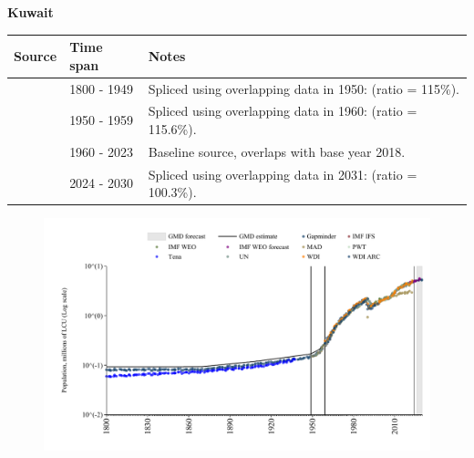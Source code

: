 \documentclass[12pt,a4paper,landscape]{article}
\begin{document}
\begin{adjustbox}{max totalsize={\paperwidth}{\paperheight},center}
\begin{minipage}[t][\textheight][t]{\textwidth}
\vspace*{0.5cm}
{}
\begin{center}
{\Large\bfseries Kuwait}
\end{center}
\vspace{0.5cm}
\begin{table}[H]
\centering
\small
\begin{tabular}{|l|l|l|}
\hline
\textbf{Source} & \textbf{Time span} & \textbf{Notes} \\
\hline
\rowcolor{white}\cite{Gapminder}& 1800 - 1949 &Spliced using overlapping data in 1950: (ratio = 115\%).\\
\rowcolor{lightgray}\cite{IMF_IFS}& 1950 - 1959 &Spliced using overlapping data in 1960: (ratio = 115.6\%).\\
\rowcolor{white}\cite{WDI}& 1960 - 2023 &Baseline source, overlaps with base year 2018.\\
\rowcolor{lightgray}\cite{Gapminder}& 2024 - 2030 &Spliced using overlapping data in 2031: (ratio = 100.3\%).\\
\hline
\end{tabular}
\end{table}
\begin{figure}[H]
\centering
\includegraphics[width=\textwidth,height=0.6\textheight,keepaspectratio]{graphs/KWT_pop.pdf}
\end{figure}
\end{minipage}
\end{adjustbox}
\end{document}
